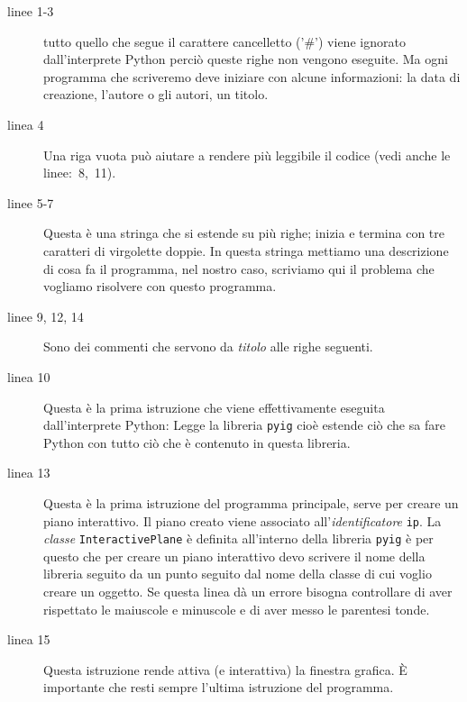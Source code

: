 \begin{description}
 \item [linee 1-3] 
 tutto quello che segue il carattere cancelletto ('\#') viene ignorato 
dall'interprete Python perciò queste righe non vengono eseguite. Ma ogni 
programma che scriveremo deve iniziare con alcune informazioni: 
la data di creazione, l'autore o gli autori, un titolo.
 \item [linea 4]
 Una riga vuota può aiutare a rendere più leggibile il codice (vedi anche le 
linee:~8,~11).
 \item [linee 5-7]
 Questa è una stringa che si estende su più righe; inizia e termina con tre 
caratteri di virgolette doppie. In questa stringa mettiamo una descrizione di 
cosa fa il programma, nel nostro caso, scriviamo qui il problema che vogliamo 
risolvere con questo programma.
 \item [linee 9, 12, 14]
 Sono dei commenti che servono da \emph{titolo} alle righe seguenti.
 \item [linea 10]
 Questa è la prima istruzione che viene effettivamente eseguita 
dall'interprete Python: Legge la libreria \lstinline{pyig} cioè estende ciò 
che sa fare Python con tutto ciò che è contenuto in questa libreria. 
 \item [linea 13]
 Questa è la prima istruzione del programma principale, serve per creare un 
piano interattivo. Il piano creato viene associato all'\emph{identificatore}
\lstinline{ip}. La \emph{classe} \lstinline{InteractivePlane} è definita 
all'interno della libreria \lstinline{pyig} è per questo che per creare un 
piano interattivo devo scrivere il nome della libreria seguito da un punto 
seguito dal nome della classe di cui voglio creare un oggetto. Se 
questa linea dà un errore bisogna controllare di aver rispettato le maiuscole 
e minuscole e di aver messo le parentesi tonde. 
 \item [linea 15]
 Questa istruzione rende attiva (e interattiva) la finestra grafica. È 
importante che resti sempre l'ultima istruzione del programma.
\end{description}

